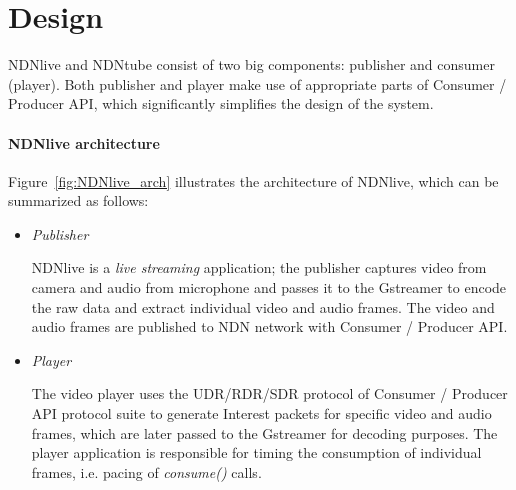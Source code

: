\vspace{0.3cm}
\section{Design} %
\label{sec:arch}
NDNlive and NDNtube consist of two big components: publisher and consumer (player). Both publisher and player make use of appropriate parts of Consumer / Producer API, which significantly simplifies the design of the system.

\paragraph{NDNlive architecture} %
\vspace{0.3cm}
\label{par:NDNlive_arch}
Figure~\ref{fig:NDNlive_arch} illustrates the architecture of NDNlive, which can be summarized as follows:

\begin{itemize}
  \item \textit{Publisher}

  NDNlive is a \textit{live streaming} application; the publisher captures video from camera and audio from microphone and passes it to the Gstreamer to encode the raw data and extract individual video and audio frames. The video and audio frames are published to NDN network with Consumer / Producer API. 

  \item \textit{Player}

  The video player uses the UDR/RDR/SDR protocol of Consumer / Producer API protocol suite to generate Interest packets for specific video and audio frames, which are later passed to the Gstreamer for decoding purposes. The player application is responsible for timing the consumption of individual frames, i.e. pacing of \textit{consume()} calls.

\end{itemize}

